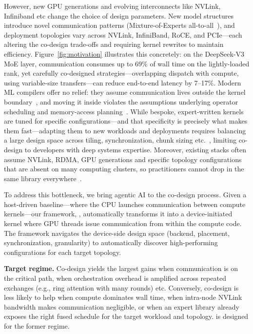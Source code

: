 However, new GPU generations and evolving interconnects like NVLink, Infiniband etc  change the choice of design parameters. New model structures introduce novel communication patterns (\eg Mixture-of-Experts all-to-all~\cite{deepep2025}), and deployment topologies vary across NVLink, InfiniBand, RoCE, and PCIe---each altering the co-design trade-offs and requiring kernel rewrites to maintain efficiency. Figure~\ref{fig:motivation} illustrates this concretely: on the DeepSeek-V3 MoE layer, communication consumes up to 69\% of wall time on the lightly-loaded rank, yet carefully co-designed strategies---overlapping dispatch with compute, using variable-size transfers---can reduce end-to-end latency by 7--17\%. Modern ML compilers offer no relief: they assume communication lives outside the kernel boundary~\cite{triton, xla, zheng2025tilelink}, and moving it inside violates the assumptions underlying operator scheduling and memory-access planning~\cite{10.1109/SC41406.2024.00094}. While bespoke, expert-written kernels are tuned for specific configurations---and that specificity is precisely what makes them fast---adapting them to new workloads and deployments requires balancing a large design space across tiling, synchronization, chunk sizing etc.~\cite{chang2024flux, zheng2025tilelink}, limiting co-design to developers with deep systems expertise. Moreover, existing stacks often assume NVLink, RDMA, GPU generations and specific topology configurations that are absent on many computing clusters, so practitioners cannot drop in the same library everywhere~\cite{deepep2025, licker2025rdmap2p}.

To address this bottleneck, we bring agentic AI to the co-design process. Given a host-driven baseline---where the CPU launches communication between compute kernels---our framework, \cufuse{}, automatically transforms it into a device-initiated kernel where GPU threads issue communication from within the compute code. The framework navigates the device-side design space (backend, placement, synchronization, granularity) to automatically discover high-performing configurations for each target topology.

\noindent\textbf{Target regime.} Co-design yields the largest gains when communication is on the critical path, when orchestration overhead is amplified across repeated exchanges (e.g., ring attention with many rounds) etc. Conversely, co-design is less likely to help when compute dominates wall time, when intra-node NVLink bandwidth makes communication negligible, or when an expert library already exposes the right fused schedule for the target workload and topology. \cufuse{} is designed for the former regime.

